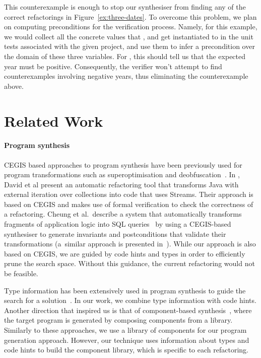 \documentclass[sigconf,review,anonymous]{acmart}
\begin{document}
  This counterexample is enough to stop our synthesiser from finding any of the correct refactorings in Figure~\ref{ex:three-dates}.
  To overcome this problem, we plan on computing preconditions for the verification process. Namely, for this example, we would collect all the concrete values that
  ,  and  get instantiated to in the unit tests associated with the given project, and use them to
  infer a precondition over the domain of these three variables. For , this should tell us that the expected year must be positive.
  Consequently, the verifier won't attempt to find counterexamples involving negative years, thus eliminating the counterexample above.


  
\section{Related Work}

\paragraph{Program synthesis}


CEGIS based approaches to program synthesis have been previously used
for program transformations such as superoptimisation and
deobfuscation~\cite{DBLP:conf/icse/JhaGST10}.  In
\cite{DBLP:journals/corr/abs-1712-07388}, David et al present an
automatic refactoring tool that transforms Java with external
iteration over collections into code that uses Streams. Their approach
is based on CEGIS and makes use of formal verification to check the
correctness of a refactoring.  Cheung et al.~describe a system that
automatically transforms fragments of application logic into SQL
queries~\cite{DBLP:conf/pldi/CheungSM13} by using a CEGIS-based
synthesiser to generate invariants and postconditions that validate
their transformations (a~similar approach is presented
in~\cite{DBLP:conf/cc/IuCZ10}).  While our approach is also based
on CEGIS, we are guided by code hints and types in
order to efficiently prune the search space. Without this guidance,
the current refactoring would not be feasible.  

Type information has been extensively used in program synthesis to
guide the search for a solution~\cite{DBLP:conf/sfp/Katayama05,DBLP:conf/pldi/FeserCD15,DBLP:conf/pldi/OseraZ15,DBLP:journals/pacmpl/LubinCOC20}.
In our work, we combine type information with code hints.
%
Another direction that inspired us is that of component-based synthesis~\cite{DBLP:conf/icse/JhaGST10,DBLP:conf/pldi/GulwaniJTV11,DBLP:conf/popl/FengM0DR17}, where the target program is generated by composing components from a library. Similarly
to these approaches, we use a library of components for our program
generation approach. However, our technique uses information about types
and code hints to build the component library, which is specific to each refactoring.
\end{document}
